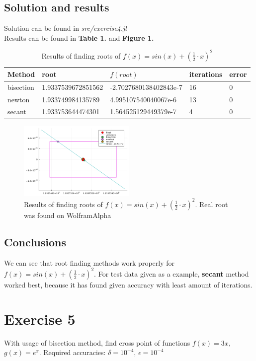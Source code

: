 \documentclass[11pt]{article}
\begin{document}
\subsection{Solution and results}
Solution can be found in \textit{src/exercise4.jl}\\
Results can be found in \textbf{Table 1.} and \textbf{Figure 1.}
\begin{table}[!ht]
    \centering
    \begin{tabular}{|l|l|l|l|l|}
    \hline
        \textbf{Method} & \textbf{root} & \textbf{$f(root)$} & \textbf{iterations} & \textbf{error} \\ \hline
        bisection & 1.9337539672851562 & -2.7027680138402843e-7 & 16 & 0 \\ \hline
        newton & 1.933749984135789 & 4.995107540040067e-6 & 13 & 0 \\ \hline
        secant & 1.933753644474301 & 1.564525129449379e-7 & 4 & 0 \\ \hline
    \end{tabular}
    \caption{Results of finding roots of $f(x) = sin(x) + (\frac{1}{2}\cdot x)^2$}
\end{table}

\begin{figure}[h]
    \centering
    \includegraphics[width=0.5\textwidth]{ex4_plot.png}
    \caption{Results of finding roots of $f(x) = sin(x) + (\frac{1}{2}\cdot x)^2$. Real root was found on WolframAlpha}
\end{figure}
\subsection{Conclusions}
We can see that root finding methods work properly for $f(x) = sin(x) + (\frac{1}{2}\cdot x)^2$.
For test data given as a example, \textbf{secant} method worked best, because it has found given accuracy with least amount of iterations.

\section{Exercise 5}
With usage of bisection method, find cross point of functions $f(x) = 3x$, $g(x) = e^x$. Required accuracies: $\delta=10^{-4}$, $\epsilon=10^{-4}$
\end{document}
